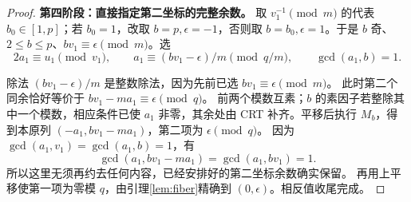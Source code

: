 \begin{proof}
\par\noindent\textbf{第四阶段：直接指定第二坐标的完整余数。}
取 $v_1^{-1}\pmod m$ 的代表 $b_0\in[1,p]$；若 $b_0=1$，改取 $b=p,\epsilon=-1$，否则取 $b=b_0,\epsilon=1$。于是 $b$ 奇、$2\le b\le p$、$bv_1\equiv\epsilon\pmod m$。选
\[
2a_1\equiv u_1\pmod{v_1},\qquad
a_1\equiv(bv_1-\epsilon)/m\pmod{q/m},\qquad \gcd(a_1,b)=1.
\]

除法 $(bv_1-\epsilon)/m$ 是整数除法，因为先前已选 $bv_1\equiv\epsilon\pmod m$。
此时第二个同余恰好等价于 $bv_1-ma_1\equiv\epsilon\pmod q$。
前两个模数互素；$b$ 的素因子若整除其中一个模数，相应条件已使 $a_1$ 非零，其余处由 CRT 补齐。平移后执行 $M_b$，得到本原列 $(-a_1,bv_1-ma_1)$，第二项为 $\epsilon\pmod q$。
因为 $\gcd(a_1,v_1)=\gcd(a_1,b)=1$，有
\[
\gcd(a_1,bv_1-ma_1)=\gcd(a_1,bv_1)=1.
\]
所以这里无须再约去任何内容，已经安排好的第二坐标余数确实保留。
再用上平移使第一项为零模 $q$，由引理\ref{lem:fiber}精确到 $(0,\epsilon)$。相反值收尾完成。
\end{proof}

